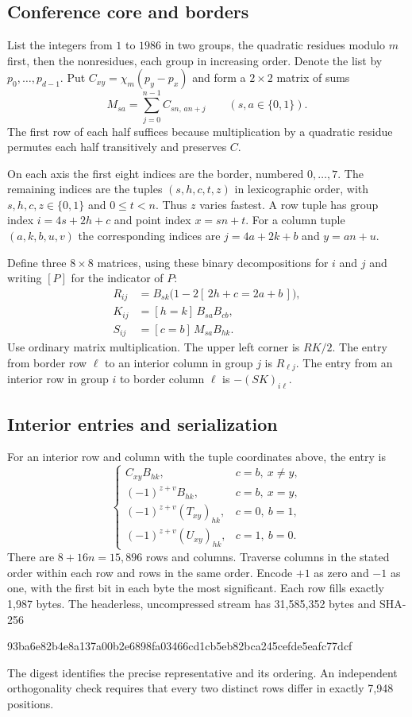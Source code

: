 \documentclass[10pt]{article}
\begin{document}
\subsection*{Conference core and borders}

List the integers from $1$ to $1986$ in two groups, the quadratic residues modulo $m$ first, then the nonresidues, each group in increasing order. Denote the list by $p_0,\ldots,p_{d-1}$. Put $C_{xy}=\chi_m(p_y-p_x)$ and form a $2\times2$ matrix of sums
\[
 M_{sa}=\sum_{j=0}^{n-1} C_{sn,\,an+j}\qquad(s,a\in\{0,1\}).
\]
The first row of each half suffices because multiplication by a quadratic residue permutes each half transitively and preserves $C$.

On each axis the first eight indices are the border, numbered $0,\ldots,7$. The remaining indices are the tuples $(s,h,c,t,z)$ in lexicographic order, with $s,h,c,z\in\{0,1\}$ and $0\le t<n$. Thus $z$ varies fastest. A row tuple has group index $i=4s+2h+c$ and point index $x=sn+t$. For a column tuple $(a,k,b,u,v)$ the corresponding indices are $j=4a+2k+b$ and $y=an+u$.

Define three $8\times8$ matrices, using these binary decompositions for $i$ and $j$ and writing $[P]$ for the indicator of $P$:
\[
 \begin{aligned}
 R_{ij} &= B_{s k}\bigl(1-2[\,2h+c=2a+b\,]\bigr),\\
 K_{ij} &= [h=k]\,B_{sa}B_{cb},\\
 S_{ij} &= [c=b]\,M_{sa}B_{hk}.
 \end{aligned}
\]
Use ordinary matrix multiplication. The upper left corner is $RK/2$. The entry from border row $\ell$ to an interior column in group $j$ is $R_{\ell j}$. The entry from an interior row in group $i$ to border column $\ell$ is $-(SK)_{i\ell}$.

\subsection*{Interior entries and serialization}

For an interior row and column with the tuple coordinates above, the entry is
\[
 \begin{cases}
 C_{xy} B_{hk}, & c=b,\ x\ne y,\\
 (-1)^{z+v}B_{hk}, & c=b,\ x=y,\\
 (-1)^{z+v}(T_{xy})_{hk}, & c=0,\ b=1,\\
 (-1)^{z+v}(U_{xy})_{hk}, & c=1,\ b=0 .
 \end{cases}
\]
There are $8+16n=15{,}896$ rows and columns. Traverse columns in the stated order within each row and rows in the same order. Encode $+1$ as zero and $-1$ as one, with the first bit in each byte the most significant. Each row fills exactly 1,987 bytes. The headerless, uncompressed stream has 31,585,352 bytes and SHA-256
\begin{center}\small\ttfamily
93ba6e82b4e8a137a00b2e6898fa03466cd1cb5eb82bca245cefde5eafc77dcf
\end{center}
The digest identifies the precise representative and its ordering. An independent orthogonality check requires that every two distinct rows differ in exactly 7,948 positions.
\end{document}
